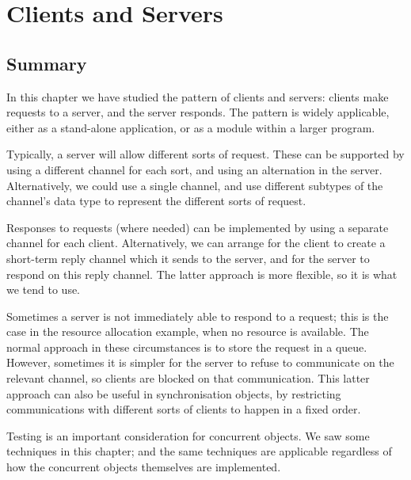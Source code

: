 \chapter{Clients and Servers}
\label{chap:clientServer}






\section{Summary}

In this chapter we have studied the pattern of clients and servers: clients
make requests to a server, and the server responds.  The pattern is widely
applicable, either as a stand-alone application, or as a module within a
larger program. 

Typically, a server will allow different sorts of request.  These can be
supported by using a different channel for each sort, and using an alternation
in the server.  Alternatively, we could use a single channel, and use
different subtypes of the channel's data type to represent the different sorts
of request. 

Responses to requests (where needed) can be implemented by using a separate
channel for each client.  Alternatively, we can arrange for the client to
create a short-term reply channel which it sends to the server, and for the
server to respond on this reply channel.  The latter approach is more
flexible, so it is what we tend to use.

Sometimes a server is not immediately able to respond to a request; this is
the case in the resource allocation example, when no resource is available.
The normal approach in these circumstances is to store the request in a queue.
However, sometimes it is simpler for the server to refuse to communicate on
the relevant channel, so clients are blocked on that communication.  This
latter approach can also be useful in synchronisation objects, by restricting
communications with different sorts of clients to happen in a fixed order. 

Testing is an important consideration for concurrent objects.  We saw some
techniques in this chapter; and the same techniques are applicable regardless
of how the concurrent objects themselves are implemented.

